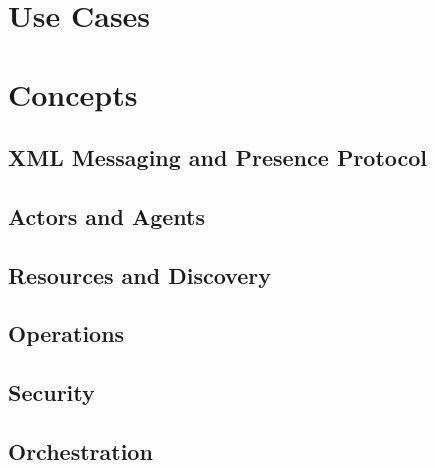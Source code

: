 \mainmatter

\part{Use Cases} %





\part{Concepts} %

\chapter{XML Messaging and Presence Protocol}





\chapter{Actors and Agents}




\chapter{Resources and Discovery}




\chapter{Operations}







\chapter{Security}






\chapter{Orchestration}


